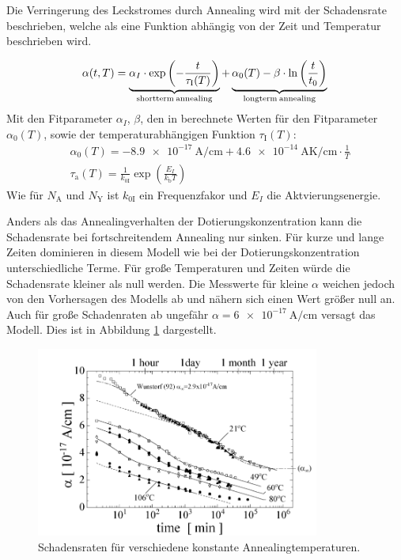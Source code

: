 Die Verringerung des Leckstromes durch Annealing wird mit der Schadensrate
beschrieben, welche als eine Funktion abhängig von der Zeit und
Temperatur beschrieben wird.\cite{moll}

\begin{align}
  \alpha(t, T) = \underbrace{\alpha_I \cdot \exp{\left(-\frac{t}{\tau_{\mathrm{I}}(T)}\right)}}_{\mathrm{shortterm \: annealing}} + \underbrace{\alpha_{\mathrm{0}}(T) -\beta \cdot \ln{\left(\frac{t}{t_{\mathrm{0}}}\right)}}_{\mathrm{longterm \: annealing}} \text{\label{eqn:damage}}
\end{align}
Mit den Fitparameter $\alpha_I$,  $\beta$, den in \cite{moll} berechnete Werten für den Fitparameter $\alpha_{\mathrm{0}}(T)$, sowie der
temperaturabhängigen Funktion $\tau_{\mathrm{I}}(T)$:
\begin{align}
  &\alpha_{\mathrm{0}}(T) = \SI{-8.9e-17}{\ampere\per\centi\meter} + \SI{4.6e-14}{\ampere\kelvin\per\centi\meter} \cdot \frac{1}{T} \\
  &\tau_{\mathrm{a}}(T) = \frac{1}{k_{0\mathrm{I}}}\exp{\left(\frac{E_{I}}{k_{\mathrm{b}}T}\right)}
\end{align}
Wie für $N_{\mathrm{A}}$ und $N_{\mathrm{Y}}$ ist $k_{0\mathrm{I}}$ ein Frequenzfakor und $E_{I}$ die Aktvierungsenergie.

Anders als das Annealingverhalten der Dotierungskonzentration kann die Schadensrate
bei fortschreitendem Annealing nur sinken. Für kurze und
lange Zeiten dominieren in diesem Modell wie bei der Dotierungskonzentration unterschiedliche
Terme. Für große Temperaturen und Zeiten würde die Schadensrate kleiner als null
werden. Die Messwerte für kleine $\alpha$ weichen jedoch von den
Vorhersagen des Modells ab und nähern sich einen Wert größer null an. Auch für große Schadenraten ab ungefähr $\alpha=\SI{6e-17}{\ampere\per\centi\meter}$
versagt das Modell.
Dies ist in Abbildung \ref{fig:damage_rates} dargestellt.

\begin{figure}
  \includegraphics[width=0.83\textwidth]{logos/schadensraten.PNG}
  \caption{Schadensraten für verschiedene konstante Annealingtemperaturen.\cite{moll}}
  \label{fig:damage_rates}
\end{figure}
